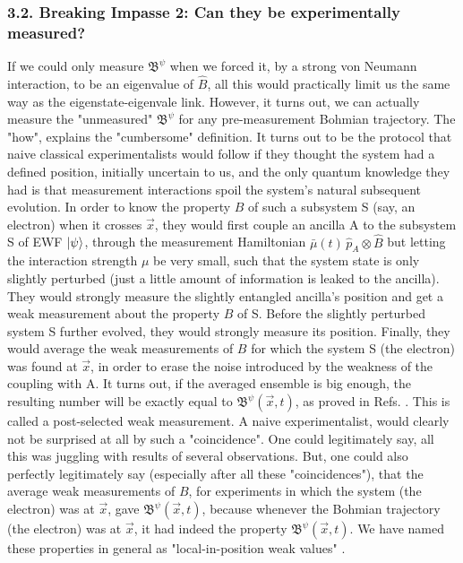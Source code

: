 \documentclass[11pt, a4paper]{article} %
\newcommand{\B}{\mathfrak{B}}
\begin{document}
\subsubsection*{3.2. Breaking Impasse 2: Can they be experimentally measured?}\vspace{-0.15cm}

 If we could only measure $\B^\psi$ when we forced it, by a strong von Neumann interaction, to be an eigenvalue of $\hat{B}$, all this would practically limit us the same way as the eigenstate-eigenvale link. However, it turns out, we can actually measure the "unmeasured" $\B^\psi$ for any pre-measurement Bohmian trajectory. The "how", explains the "cumbersome" definition. It turns out to be the protocol that naive classical experimentalists \cite{WisemanVel} would follow if they thought the system had a defined position, initially uncertain to us, and the only quantum knowledge they had is that measurement interactions spoil the system's natural subsequent evolution. In order to know the property $B$ of such a subsystem S (say, an electron) when it crosses $\vec{x}$, they would first couple an ancilla A to the subsystem S of EWF $\ket{\psi}$, through the measurement Hamiltonian $\bar{\mu}(t)\,\hat{p}_A\otimes\hat{B}$ but letting the interaction strength $\mu$ be very small, such that the system state is only slightly perturbed (just a little amount of information is leaked to the ancilla). They would strongly measure the slightly entangled ancilla's position and get a weak measurement about the property $B$ of S. Before the slightly perturbed system S further evolved, they would strongly measure its position. Finally, they would average the weak measurements of $B$ for which the system S (the electron) was found at $\vec{x}$, in order to erase the noise introduced by the weakness of the coupling with A. It turns out, if the averaged ensemble is big enough, the resulting number will be exactly equal to $\B^\psi(\vec{x},t)$, as proved in Refs. \cite{Weak, DevInPosition1}. This is called a post-selected weak measurement. A naive experimentalist, would clearly not be surprised at all by such a "coincidence". One could legitimately say, all this was juggling with results of several observations. But, one could also perfectly legitimately say (especially after all these "coincidences"), that the average weak measurements of $B$, for experiments in which the system (the electron) was at $\vec{x}$, gave $\B^\psi(\vec{x},t)$, because whenever the Bohmian trajectory (the electron) was at $\vec{x}$, it had indeed the property $\B^\psi(\vec{x},t)$. We have named these properties in general as "local-in-position weak values" \cite{DevInPosition1, DevInPosition2}.\vspace{-0.15cm}
\end{document}

